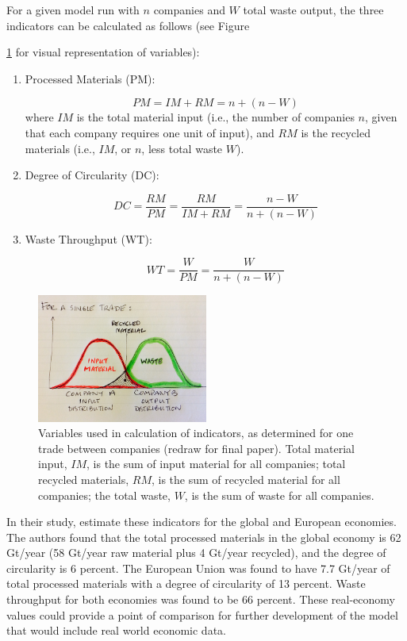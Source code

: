 \documentclass[fleqn,10pt]{wlscirep}
\begin{document}
For a given model run with $n$ companies and $W$ total waste output, the three indicators can be calculated as follows (see Figure {\ref{fig:Variables} for visual representation of variables):

\begin{enumerate}
\item Processed Materials (PM): 

\[PM = IM+RM = n+(n-W)\]
where $IM$ is the total material input (i.e., the number of companies $n$, given that each company requires one unit of input), and $RM$ is the recycled materials (i.e., $IM$, or $n$, less total waste $W$).

\item Degree of Circularity (DC):

\[DC = \frac{RM}{PM}=\frac{RM}{IM+RM}=\frac{n-W}{n+(n-W)}\]

\item Waste Throughput (WT):

\[WT = \frac{W}{PM}=\frac{W}{n+(n-W)}\]
\end{enumerate}


\begin{figure}
\centering
\includegraphics[width=0.5\textwidth]{figures/Variables.png}
\caption{\label{fig:Variables}Variables used in calculation of indicators, as determined for one trade between companies (redraw for final paper). Total material input, $IM$, is the sum of input material for all companies; total recycled materials, $RM$, is the sum of recycled material for all companies; the total waste, $W$, is the sum of waste for all companies.}
\end{figure}


In their study, \cite{haas2015circular} estimate these indicators for the global and European economies. The authors found that the total processed materials in the global economy is 62 Gt/year (58 Gt/year raw material plus 4 Gt/year recycled), and the degree of circularity is 6 percent. The European Union was found to have 7.7 Gt/year of total processed materials with a degree of circularity of 13 percent. Waste throughput for both economies was found to be 66 percent. These real-economy values could provide a point of comparison for further development of the model that would include real world economic data.

}
\end{document}
